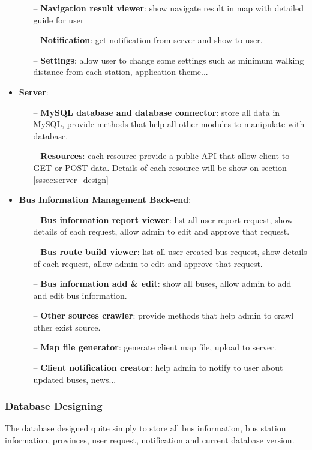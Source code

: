 \begin{itemize}
\begin{itemize}
					\item[--] \textbf{Navigation result viewer}: show navigate result in map with detailed guide for user
					\item[--] \textbf{Notification}: get notification from server and show to user.
					\item[--] \textbf{Settings}: allow user to change some settings such as minimum walking distance from each station, application theme...
				\end{itemize}
			\item \textbf{Server}: 
				\begin{itemize}
					\item[--] \textbf{MySQL database and database connector}: store all data in MySQL, provide methods that help all other modules to manipulate with database.
					\item[--] \textbf{Resources}: each resource provide a public API that allow client to GET or POST data. Details of each resource will be show on section \ref{sssec:server_design}
				\end{itemize}
			\item \textbf{Bus Information Management Back-end}: 
				\begin{itemize}
					\item[--] \textbf{Bus information report viewer}: list all user report request, show details of each request, allow admin to edit and approve that request.
					\item[--] \textbf{Bus route build viewer}: list all user created bus request, show details of each request, allow admin to edit and approve that request.
					\item[--] \textbf{Bus information add \& edit}: show all buses, allow admin to add and edit bus information.
					\item[--] \textbf{Other sources crawler}: provide methods that help admin to crawl other exist source.
					\item[--] \textbf{Map file generator}: generate client map file, upload to server.
					\item[--] \textbf{Client notification creator}: help admin to notify to user about updated buses, news...
				\end{itemize}
		\end{itemize}
	\subsubsection{Database Designing}
		The database designed quite simply to store all bus information, bus station information, provinces, user request, notification and current database version.
